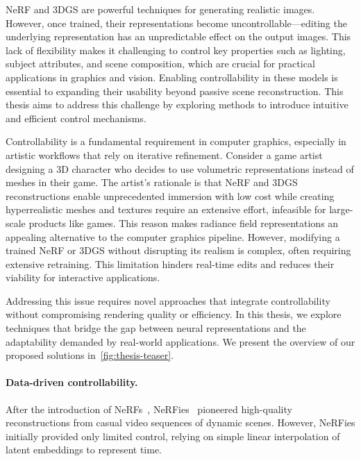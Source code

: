   NeRF and 3DGS are powerful techniques for generating realistic images.
  However, once trained, their representations become uncontrollable---editing
  the underlying representation has an unpredictable effect on the output
  images.
  This lack of flexibility makes it challenging to control key properties such
  as lighting, subject attributes, and scene composition, which are crucial for
  practical applications in graphics and vision.
  Enabling controllability in these models is essential to expanding their
  usability beyond passive scene reconstruction.
  This thesis aims to address this challenge by exploring methods to introduce
  intuitive and efficient control mechanisms.

  Controllability is a fundamental requirement in computer graphics, especially
  in artistic workflows that rely on iterative refinement.
  Consider a game artist designing a 3D character who decides to use volumetric
  representations instead of meshes in their game.
  The artist's rationale is that NeRF and 3DGS reconstructions enable
  unprecedented immersion with low cost while creating hyperrealistic meshes and
  textures require an extensive effort, infeasible for large-scale products like
  games.
  This reason makes radiance field representations an appealing alternative to
  the computer graphics pipeline.
  However, modifying a trained NeRF or 3DGS without disrupting its realism is
  complex, often requiring extensive retraining.
  This limitation hinders real-time edits and reduces their viability for
  interactive applications.

  Addressing this issue requires novel approaches that integrate controllability
  without compromising rendering quality or efficiency.
  In this thesis, we explore techniques that bridge the gap between neural
  representations and the adaptability demanded by real-world applications.
  We present the overview of our proposed solutions in~\cref{fig:thesis-teaser}.

  \paragraph{Data-driven controllability.}
    After the introduction of NeRFs~\cite{mildenhall2020nerf},
    NeRFies~\cite{park2021nerfies} pioneered high-quality reconstructions from
    casual video sequences of dynamic scenes.
    However, NeRFies initially provided only limited control, relying on simple
    linear interpolation of latent embeddings to represent time.

